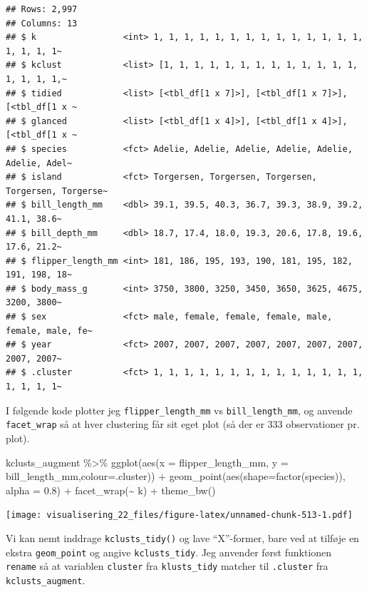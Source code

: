 \documentclass[
]{book}
\newenvironment{Shaded}{\begin{snugshade}}{\end{snugshade}}
\newcommand{\AttributeTok}[1]{\textcolor[rgb]{0.77,0.63,0.00}{#1}}
\newcommand{\FloatTok}[1]{\textcolor[rgb]{0.00,0.00,0.81}{#1}}
\newcommand{\FunctionTok}[1]{\textcolor[rgb]{0.00,0.00,0.00}{#1}}
\newcommand{\NormalTok}[1]{#1}
\newcommand{\SpecialCharTok}[1]{\textcolor[rgb]{0.00,0.00,0.00}{#1}}
\begin{document}
\begin{verbatim}
## Rows: 2,997
## Columns: 13
## $ k                 <int> 1, 1, 1, 1, 1, 1, 1, 1, 1, 1, 1, 1, 1, 1, 1, 1, 1, 1~
## $ kclust            <list> [1, 1, 1, 1, 1, 1, 1, 1, 1, 1, 1, 1, 1, 1, 1, 1, 1,~
## $ tidied            <list> [<tbl_df[1 x 7]>], [<tbl_df[1 x 7]>], [<tbl_df[1 x ~
## $ glanced           <list> [<tbl_df[1 x 4]>], [<tbl_df[1 x 4]>], [<tbl_df[1 x ~
## $ species           <fct> Adelie, Adelie, Adelie, Adelie, Adelie, Adelie, Adel~
## $ island            <fct> Torgersen, Torgersen, Torgersen, Torgersen, Torgerse~
## $ bill_length_mm    <dbl> 39.1, 39.5, 40.3, 36.7, 39.3, 38.9, 39.2, 41.1, 38.6~
## $ bill_depth_mm     <dbl> 18.7, 17.4, 18.0, 19.3, 20.6, 17.8, 19.6, 17.6, 21.2~
## $ flipper_length_mm <int> 181, 186, 195, 193, 190, 181, 195, 182, 191, 198, 18~
## $ body_mass_g       <int> 3750, 3800, 3250, 3450, 3650, 3625, 4675, 3200, 3800~
## $ sex               <fct> male, female, female, female, male, female, male, fe~
## $ year              <fct> 2007, 2007, 2007, 2007, 2007, 2007, 2007, 2007, 2007~
## $ .cluster          <fct> 1, 1, 1, 1, 1, 1, 1, 1, 1, 1, 1, 1, 1, 1, 1, 1, 1, 1~
\end{verbatim}

I følgende kode plotter jeg \texttt{flipper\_length\_mm} vs \texttt{bill\_length\_mm}, og anvende \texttt{facet\_wrap} så at hver clustering får sit eget plot (så der er 333 observationer pr. plot).

\begin{Shaded}
\begin{Highlighting}[]
\NormalTok{kclusts\_augment }\SpecialCharTok{\%\textgreater{}\%} 
  \FunctionTok{ggplot}\NormalTok{(}\FunctionTok{aes}\NormalTok{(}\AttributeTok{x =}\NormalTok{ flipper\_length\_mm, }\AttributeTok{y =}\NormalTok{ bill\_length\_mm,}\AttributeTok{colour=}\NormalTok{.cluster)) }\SpecialCharTok{+}
        \FunctionTok{geom\_point}\NormalTok{(}\FunctionTok{aes}\NormalTok{(}\AttributeTok{shape=}\FunctionTok{factor}\NormalTok{(species)), }\AttributeTok{alpha =} \FloatTok{0.8}\NormalTok{) }\SpecialCharTok{+} 
        \FunctionTok{facet\_wrap}\NormalTok{(}\SpecialCharTok{\textasciitilde{}}\NormalTok{ k) }\SpecialCharTok{+} 
        \FunctionTok{theme\_bw}\NormalTok{() }
\end{Highlighting}
\end{Shaded}

\texttt{[image: visualisering\_22\_files/figure-latex/unnamed-chunk-513-1.pdf]}

Vi kan nemt inddrage \texttt{kclusts\_tidy()} og lave ``X''-former, bare ved at tilføje en ekstra \texttt{geom\_point} og angive \texttt{kclusts\_tidy}. Jeg anvender først funktionen \texttt{rename} så at variablen \texttt{cluster} fra \texttt{klusts\_tidy} matcher til \texttt{.cluster} fra \texttt{kclusts\_augment}.
\end{document}
